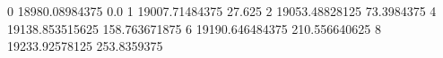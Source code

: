 0 18980.08984375 0.0
1 19007.71484375 27.625
2 19053.48828125 73.3984375
4 19138.853515625 158.763671875
6 19190.646484375 210.556640625
8 19233.92578125 253.8359375
